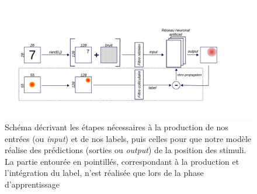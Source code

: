\begin{figure}[th]
\centering
\includegraphics[scale=0.65]{Figures/Model}
\decoRule
\caption[Figure]{Schéma décrivant les étapes nécessaires à la production de nos entrées (ou \textit{input}) et de nos labels, puis celles pour que notre modèle réalise des prédictions (sorties ou \textit{output}) de la position des stimuli. La partie entourée en pointillés, correspondant à la production et l'intégration du label, n'est réalisée que lors de la phase d'apprentissage}
\label{fig:model}
\end{figure}

